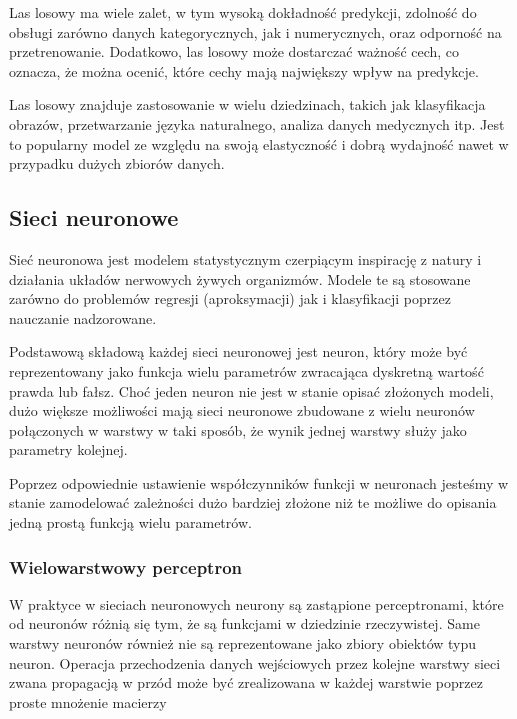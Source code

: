 \documentclass{article}
\begin{document}
Las losowy ma wiele zalet, w tym wysoką dokładność 
predykcji, zdolność do obsługi zarówno danych 
kategorycznych, jak i numerycznych, oraz odporność 
na przetrenowanie. Dodatkowo, las losowy może dostarczać 
ważność cech, co oznacza, że można ocenić, które cechy 
mają największy wpływ na predykcje.

Las losowy znajduje zastosowanie w wielu dziedzinach, 
takich jak klasyfikacja obrazów, przetwarzanie 
języka naturalnego, analiza danych medycznych itp. 
Jest to popularny model ze względu na swoją elastyczność 
i dobrą wydajność nawet w przypadku dużych zbiorów danych.

\subsection{Sieci neuronowe}
Sieć neuronowa jest modelem statystycznym czerpiącym inspirację z natury i 
działania układów nerwowych żywych organizmów.
Modele te są stosowane zarówno do problemów regresji (aproksymacji) jak i klasyfikacji poprzez nauczanie nadzorowane.

Podstawową składową każdej sieci neuronowej jest neuron, który może być reprezentowany 
jako funkcja wielu parametrów zwracająca dyskretną wartość
prawda lub fałsz. Choć jeden neuron nie jest w stanie opisać złożonych modeli, 
dużo większe możliwości mają sieci neuronowe zbudowane z wielu neuronów
połączonych w warstwy w taki sposób, że wynik jednej warstwy służy jako parametry kolejnej.


Poprzez odpowiednie ustawienie współczynników funkcji w neuronach jesteśmy w 
stanie zamodelować zależności dużo bardziej złożone niż te możliwe do opisania jedną
prostą funkcją wielu parametrów.

\subsubsection{Wielowarstwowy perceptron}

W praktyce w sieciach neuronowych neurony są zastąpione perceptronami, które od neuronów 
różnią się tym, że są funkcjami w dziedzinie rzeczywistej.
Same warstwy neuronów również nie są reprezentowane jako zbiory obiektów typu neuron. 
Operacja przechodzenia danych wejściowych przez kolejne warstwy sieci
zwana propagacją w przód może być zrealizowana w każdej warstwie poprzez proste mnożenie macierzy
\end{document}

